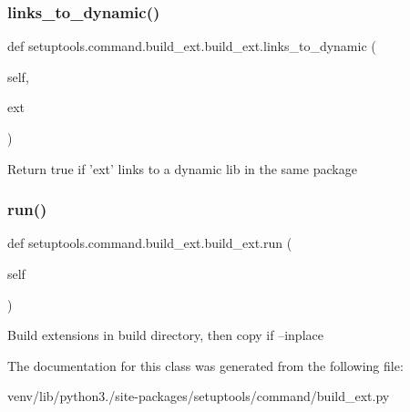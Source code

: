 \subsubsection{\texorpdfstring{links\+\_\+to\+\_\+dynamic()}{links\_to\_dynamic()}}
{\footnotesize\ttfamily def setuptools.\+command.\+build\+\_\+ext.\+build\+\_\+ext.\+links\+\_\+to\+\_\+dynamic (\begin{DoxyParamCaption}\item[{}]{self,  }\item[{}]{ext }\end{DoxyParamCaption})}

\begin{DoxyVerb}Return true if 'ext' links to a dynamic lib in the same package\end{DoxyVerb}
 \mbox{\label{classsetuptools_1_1command_1_1build__ext_1_1build__ext_a0372d0eabace81aa2e90696daadc6d53}} 
\subsubsection{\texorpdfstring{run()}{run()}}
{\footnotesize\ttfamily def setuptools.\+command.\+build\+\_\+ext.\+build\+\_\+ext.\+run (\begin{DoxyParamCaption}\item[{}]{self }\end{DoxyParamCaption})}

\begin{DoxyVerb}Build extensions in build directory, then copy if --inplace\end{DoxyVerb}
 

The documentation for this class was generated from the following file\+:\begin{DoxyCompactItemize}
\item 
venv/lib/python3./site-\/packages/setuptools/command/build\+\_\+ext.\+py\end{DoxyCompactItemize}
